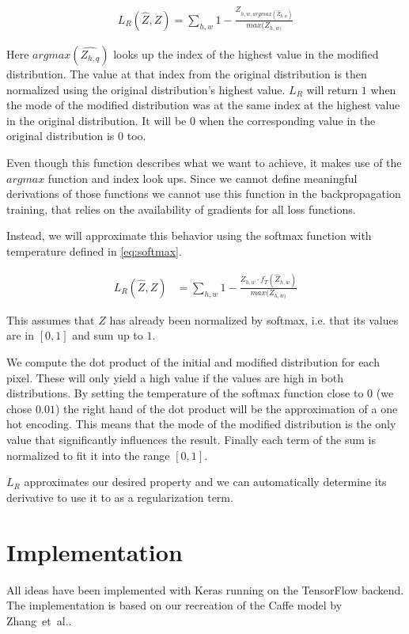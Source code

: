 \documentclass[11pt]{article}
\begin{document}
\begin{align}
    L_R(\hat{Z}, Z) = \sum_{h, w}{1-\frac{Z_{h,w,argmax(\hat{Z}_{h,w})}}{max(Z_{h,w)}}}
\end{align}

Here $argmax(\hat{Z_{h,q}})$ looks up the index of the highest value in the modified distribution. The value at that index from the original distribution is then normalized using the original distribution's highest value. $L_R$ will return $1$ when the mode of the modified distribution was at the same index at the highest value in the original distribution. It will be $0$ when the corresponding value in the original distribution is $0$ too.

Even though this function describes what we want to achieve, it makes use of the $argmax$ function and index look ups. Since we cannot define meaningful derivations of those functions we cannot use this function in the backpropagation training, that relies on the availability of gradients for all loss functions.

Instead, we will approximate this behavior using the softmax function with temperature defined in \autoref{eq:softmax}.

\begin{align}
    L_R(\hat{Z}, Z) &= \sum_{h, w}{1-\frac{Z_{h,w} \cdot f_T(\hat{Z}_{h, w})}{max(Z_{h,w)}}}
\end{align}

This assumes that $Z$ has already been normalized by softmax, i.e. that its values are in $[0,1]$ and sum up to $1$.

We compute the dot product of the initial and modified distribution for each pixel. These will only yield a high value if the values are high in both distributions. By setting the temperature of the softmax function close to $0$ (we chose $0.01$) the right hand of the dot product will be the approximation of a one hot encoding. This means that the mode of the modified distribution is the only value that significantly influences the result. Finally each term of the sum is normalized to fit it into the range $[0,1]$.

$L_R$ approximates our desired property and we can automatically determine its derivative to use it to as a regularization term.

\section{Implementation}

All ideas have been implemented with Keras running on the TensorFlow backend. The implementation is based on our recreation of the Caffe model by Zhang~et~al.\cite{zhang2016colorful}.
\end{document}
